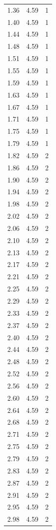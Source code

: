 \begin{longtable}{lrr}
  1.36 & 4.59 & 1 \\
  1.40 & 4.59 & 1 \\
  1.44 & 4.59 & 1 \\
  1.48 & 4.59 & 1 \\
  1.51 & 4.59 & 1 \\
  1.55 & 4.59 & 1 \\
  1.59 & 4.59 & 1 \\
  1.63 & 4.59 & 1 \\
  1.67 & 4.59 & 1 \\
  1.71 & 4.59 & 1 \\
  1.75 & 4.59 & 1 \\
  1.79 & 4.59 & 1 \\
  1.82 & 4.59 & 2 \\
  1.86 & 4.59 & 2 \\
  1.90 & 4.59 & 2 \\
  1.94 & 4.59 & 2 \\
  1.98 & 4.59 & 2 \\
  2.02 & 4.59 & 2 \\
  2.06 & 4.59 & 2 \\
  2.10 & 4.59 & 2 \\
  2.13 & 4.59 & 2 \\
  2.17 & 4.59 & 2 \\
  2.21 & 4.59 & 2 \\
  2.25 & 4.59 & 2 \\
  2.29 & 4.59 & 2 \\
  2.33 & 4.59 & 2 \\
  2.37 & 4.59 & 2 \\
  2.40 & 4.59 & 2 \\
  2.44 & 4.59 & 2 \\
  2.48 & 4.59 & 2 \\
  2.52 & 4.59 & 2 \\
  2.56 & 4.59 & 2 \\
  2.60 & 4.59 & 2 \\
  2.64 & 4.59 & 2 \\
  2.68 & 4.59 & 2 \\
  2.71 & 4.59 & 2 \\
  2.75 & 4.59 & 2 \\
  2.79 & 4.59 & 2 \\
  2.83 & 4.59 & 2 \\
  2.87 & 4.59 & 2 \\
  2.91 & 4.59 & 2 \\
  2.95 & 4.59 & 2 \\
  2.98 & 4.59 & 2 \\

\end{longtable}
